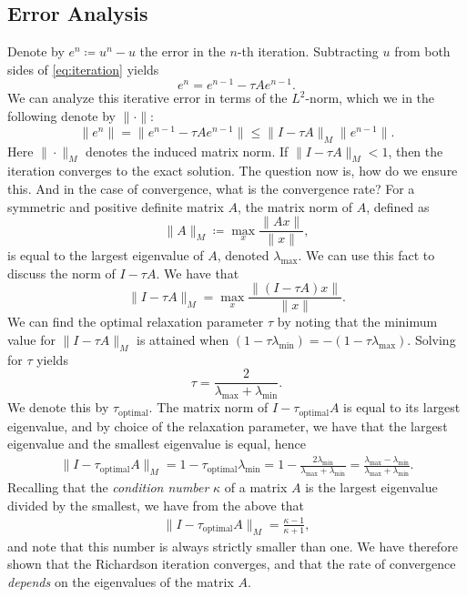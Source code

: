 \subsection{Error Analysis}
\label{sub:error_analysis}

Denote by \( e^n \coloneqq u^n - u \) the error in the \(n\)-th iteration.
Subtracting \( u \) from both sides of \cref{eq:iteration} yields
\begin{equation}
    \label{eq:iteration_error}
    e^n = e^{n-1} - \tau Ae^{n-1}.
\end{equation}
We can analyze this iterative error in terms of the \( L^2 \)-norm, which we in
the following denote by \( \| \cdot \| \):
\begin{equation}
    \| e^n \| = \| e^{n-1} - \tau Ae^{n-1} \| \leq \| I - \tau A\|_M \| e^{n-1}\|.
\end{equation}
Here \( \| \cdot \|_M\) denotes the induced matrix norm. If \( \| I - \tau A
\|_M < 1 \), then the iteration converges to the exact solution. The question
now is, how do we ensure this. And in the case of convergence, what is the
convergence rate?  For a symmetric and positive definite matrix \( A \), the
matrix norm of \( A \), defined as
\begin{equation}
    \| A \|_M \coloneqq \max_x \frac{\|Ax\|}{\|x\|},
\end{equation}
is equal to the largest eigenvalue of \( A \), denoted \( \lambda_{\max} \). We
can use this fact to discuss the norm of \( I - \tau A \). We have that
\begin{equation}
    \| I - \tau A \|_M = \max_x \frac{\|(I - \tau A)x\|}{\| x \|}.
\end{equation}
We can find the optimal relaxation parameter \( \tau \) by noting that the
minimum value for \( \| I - \tau A \|_M \) is attained when \( (1 - \tau
\lambda_{\min}) = - (1 - \tau \lambda_{\max}) \). Solving for \( \tau \) yields 
\begin{equation}
    \tau = \frac{2}{\lambda_{\max} + \lambda_{\min}}.
\end{equation}
We denote this by \( \tau_{\mathrm{optimal}} \).  The matrix norm of \( I -
\tau_{\mathrm{optimal}} A\) is equal to its largest eigenvalue, and by choice
of the relaxation parameter, we have that the largest eigenvalue and the
smallest eigenvalue is equal, hence
\begin{align}
    \| I - \tau_{\mathrm{optimal}} A\|_M   = 1 - \tau_{\mathrm{optimal}}
    \lambda_{\min} = 1 - \frac{2\lambda_{\min}}{\lambda_{\max} +
    \lambda_{\min}} = \frac{\lambda_{\max} - \lambda_{\min}}{\lambda_{\max} +
    \lambda_{\min}}.
\end{align}
Recalling that the \emph{condition number} \( \kappa \) of a matrix \( A \) is
the largest eigenvalue divided by the smallest, we have from the above that
\begin{align}
    \| I - \tau_{\mathrm{optimal}} A\|_M = \frac{\kappa - 1}{\kappa + 1}, 
\end{align}
and note that this number is always strictly smaller than one. We have
therefore shown that the Richardson iteration converges, and that the rate of
convergence \emph{depends} on the eigenvalues of the matrix \( A \).

